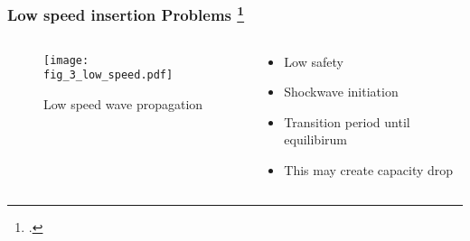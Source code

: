 
\begin{frame}
    \frametitle{Low speed insertion Problems  \footcite{Duret2010:TRB}}
    \begin{columns}
      \begin{column}{0.5\linewidth}
        \begin{figure}
          \texttt{[image: fig\_3\_low\_speed.pdf]}
          \caption{\scriptsize Low speed wave propagation}
        \end{figure}
      \end{column}
      \begin{column}{0.5\linewidth}
        \begin{itemize}[<+->]
          \item Low safety 
          \item Shockwave initiation
          \item Transition period until equilibirum 
          \item This may create capacity drop  
        \end{itemize}
      \end{column}
    \end{columns}
\end{frame}
